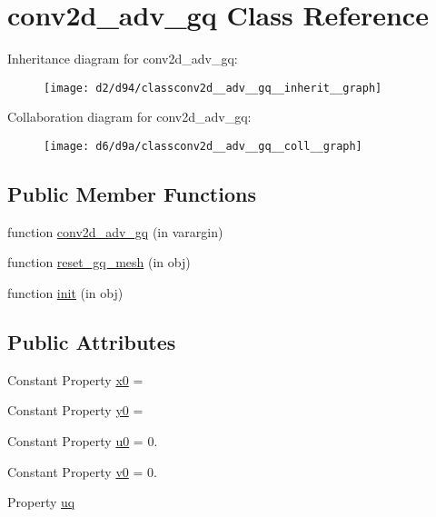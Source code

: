 \hypertarget{classconv2d__adv__gq}{}\section{conv2d\+\_\+adv\+\_\+gq Class Reference}
\label{classconv2d__adv__gq}


Inheritance diagram for conv2d\+\_\+adv\+\_\+gq\+:
\nopagebreak
\begin{figure}[H]
\begin{center}
\leavevmode
\texttt{[image: d2/d94/classconv2d\_\_adv\_\_gq\_\_inherit\_\_graph]}
\end{center}
\end{figure}


Collaboration diagram for conv2d\+\_\+adv\+\_\+gq\+:
\nopagebreak
\begin{figure}[H]
\begin{center}
\leavevmode
\texttt{[image: d6/d9a/classconv2d\_\_adv\_\_gq\_\_coll\_\_graph]}
\end{center}
\end{figure}
\subsection*{Public Member Functions}
\begin{DoxyCompactItemize}
\item 
function \hyperlink{classconv2d__adv__gq_a473c9056ad94e994e82e274fec9316c6}{conv2d\+\_\+adv\+\_\+gq} (in varargin)
\item 
function \hyperlink{classconv2d__adv__gq_a5e61222766cf25482160df1ef16a1841}{reset\+\_\+gq\+\_\+mesh} (in obj)
\item 
function \hyperlink{classconv2d__adv__gq_a491970f09faf878c242489d926c4fe8b}{init} (in obj)
\end{DoxyCompactItemize}
\subsection*{Public Attributes}
\begin{DoxyCompactItemize}
\item 
Constant Property \hyperlink{classconv2d__adv__gq_a7308924ffc2c42069e7b02b849f69748}{x0} =
\item 
Constant Property \hyperlink{classconv2d__adv__gq_aeac30ee616feaa885cd2c3d55998d00d}{y0} =
\item 
Constant Property \hyperlink{classconv2d__adv__gq_a8ca901410856c4fcc4a50d0266a5f156}{u0} = 0.
\item 
Constant Property \hyperlink{classconv2d__adv__gq_a4b44007260e7244b75d54d81ac93aab9}{v0} = 0.
\item 
Property \hyperlink{classconv2d__adv__gq_a98941d3c5babb4e6f62e81d4033dfa0f}{uq}
\end{DoxyCompactItemize}
